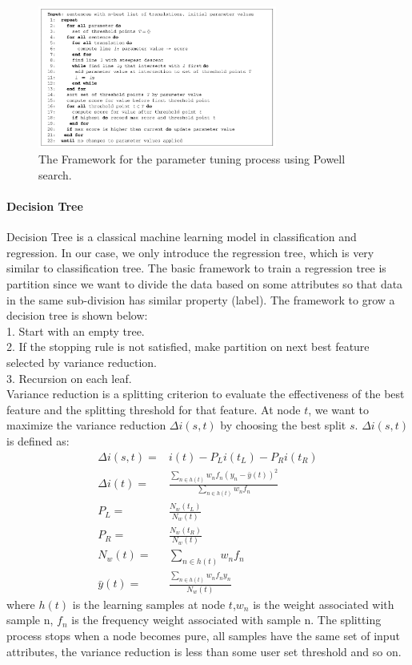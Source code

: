 \begin{figure}[!htb]
  \centering
  \includegraphics[width=0.7\textwidth]{MERT/mert.png}
  \caption{The Framework for the parameter tuning process using Powell search.
}
    \label{mert1}
\end{figure}

\paragraph{Decision Tree}

Decision Tree is a classical machine learning model in classification and regression. In our case, we only introduce the regression tree, which is very similar to classification tree. The basic framework to train a regression tree is partition since we want to divide the data based on some attributes so that data in the same sub-division has similar property (label).  The framework to grow a decision tree is shown below:\\
1. Start with an empty tree.\\
2. If the stopping rule is not satisfied, make partition on next best feature selected by variance reduction.\\
3. Recursion on each leaf.\\
Variance reduction is a splitting criterion to evaluate the effectiveness of the best feature and the splitting threshold for that feature. At node $t$, we want to maximize the variance reduction $\Delta i(s,t)$ by choosing the best split $s$. $\Delta i(s,t)$ is defined as:
\begin{align}
\Delta i(s,t) =& i(t) - P_L i(t_L)-P_Ri(t_R)\\
\Delta i(t) = & \frac{\sum_{n \in h(t)} w_n f_n (y_n - \bar{y}(t))^2}{\sum_{n \in h(t)} w_n f_n}\\
P_L = & \frac{ N_w(t_L)}{N_w (t)}\\
P_R = & \frac{ N_w(t_R)}{N_w (t)}\\
N_w(t) = & \sum_{n \in h(t)} w_n f_n\\
\bar{y}(t) = & \frac{\sum_{n \in h(t)} w_n f_n y_n}{N_w (t)}
\end{align}
where $h(t)$ is the learning samples at node $t$,$w_n$ is the weight associated with sample n, $f_n$ is the frequency weight associated with sample n. The splitting process stops when a node becomes pure, all samples have the same set of input attributes, the variance reduction is less than some user set threshold and so on.

